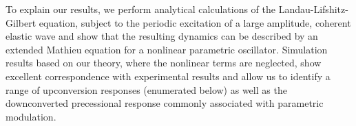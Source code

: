 \documentclass[aps,showpacs,prb,twocolumn,superscriptaddress]{revtex4}
\begin{document}



To explain our results, we perform analytical calculations of the Landau-Lifshitz-Gilbert equation, subject to the periodic excitation of a large amplitude, coherent elastic wave and show that the resulting dynamics can be described by an extended Mathieu equation for a nonlinear parametric oscillator.  Simulation results based on our theory, where the nonlinear terms are neglected, show excellent correspondence with experimental results and allow us to identify a range of upconversion responses (enumerated below) as well as the downconverted precessional response commonly associated with parametric modulation.  
\end{document}
